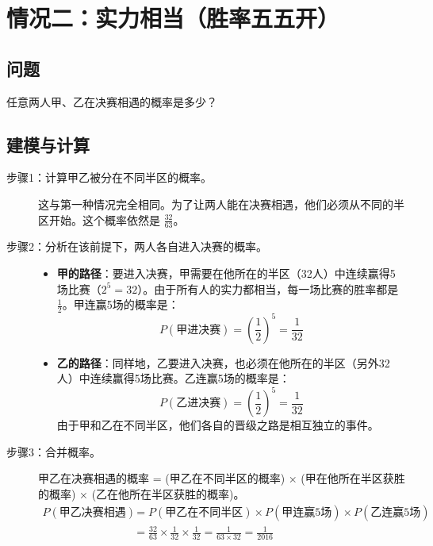 \documentclass{article}
\begin{document}
\section{情况二：实力相当（胜率五五开）}
\subsection*{问题}
任意两人甲、乙在决赛相遇的概率是多少？

\subsection*{建模与计算}
\begin{description}
    \item[步骤1：计算甲乙被分在不同半区的概率。]
    这与第一种情况完全相同。为了让两人能在决赛相遇，他们必须从不同的半区开始。这个概率依然是 $\frac{32}{63}$。
    
    \item[步骤2：分析在该前提下，两人各自进入决赛的概率。]
    \begin{itemize}
        \item \textbf{甲的路径}：要进入决赛，甲需要在他所在的半区（32人）中连续赢得5场比赛（$2^5 = 32$）。由于所有人的实力都相当，每一场比赛的胜率都是 $\frac{1}{2}$。甲连赢5场的概率是：
        $$ P(\text{甲进决赛}) = \left(\frac{1}{2}\right)^5 = \frac{1}{32} $$
        \item \textbf{乙的路径}：同样地，乙要进入决赛，也必须在他所在的半区（另外32人）中连续赢得5场比赛。乙连赢5场的概率是：
        $$ P(\text{乙进决赛}) = \left(\frac{1}{2}\right)^5 = \frac{1}{32} $$
        由于甲和乙在不同半区，他们各自的晋级之路是相互独立的事件。
    \end{itemize}
    
    \item[步骤3：合并概率。]
    甲乙在决赛相遇的概率 = (甲乙在不同半区的概率) × (甲在他所在半区获胜的概率) × (乙在他所在半区获胜的概率)。
    \begin{align*}
        P(\text{甲乙决赛相遇}) &= P(\text{甲乙在不同半区}) \times P(\text{甲连赢5场}) \times P(\text{乙连赢5场}) \\
        &= \frac{32}{63} \times \frac{1}{32} \times \frac{1}{32} = \frac{1}{63 \times 32} = \frac{1}{2016}
    \end{align*}
\end{description}
\end{document}
